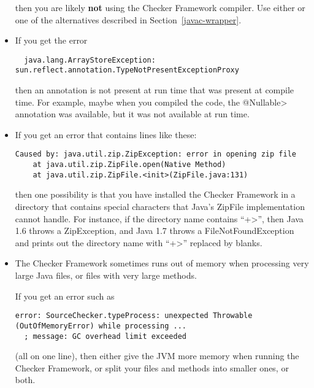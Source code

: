 \begin{itemize}
\begin{sloppypar}
\noindent
then you are likely \textbf{not} using the Checker Framework compiler.  Use
either  or one of the alternatives
described in Section~\ref{javac-wrapper}.
\end{sloppypar}

\item
If you get the error

\begin{Verbatim}
  java.lang.ArrayStoreException: sun.reflect.annotation.TypeNotPresentExceptionProxy
\end{Verbatim}

\noindent
then an annotation is not present at run time that was present at compile
time.  For example, maybe when you compiled the code, the \<@Nullable>
annotation was available, but it was not available at run time.

\item
If you get an error that contains lines like these:

\begin{Verbatim}
Caused by: java.util.zip.ZipException: error in opening zip file
    at java.util.zip.ZipFile.open(Native Method)
    at java.util.zip.ZipFile.<init>(ZipFile.java:131)
\end{Verbatim}

\noindent
then one possibility is that you have installed the Checker Framework in a
directory that contains special characters that Java's ZipFile
implementation cannot handle.  For instance, if the directory name contains
``\<+>'', then Java 1.6 throws a ZipException, and Java 1.7 throws a
FileNotFoundException and prints out the directory name with ``\<+>''
replaced by blanks.

\item
The Checker Framework sometimes runs out of memory when processing very
large Java files, or files with very large methods.

If you get an error such as
\begin{Verbatim}
error: SourceChecker.typeProcess: unexpected Throwable (OutOfMemoryError) while processing ...
  ; message: GC overhead limit exceeded
\end{Verbatim}

\noindent
(all on one line),
then either give the JVM more memory when running the Checker Framework, or
split your files and methods into smaller ones, or both.


\end{itemize}
